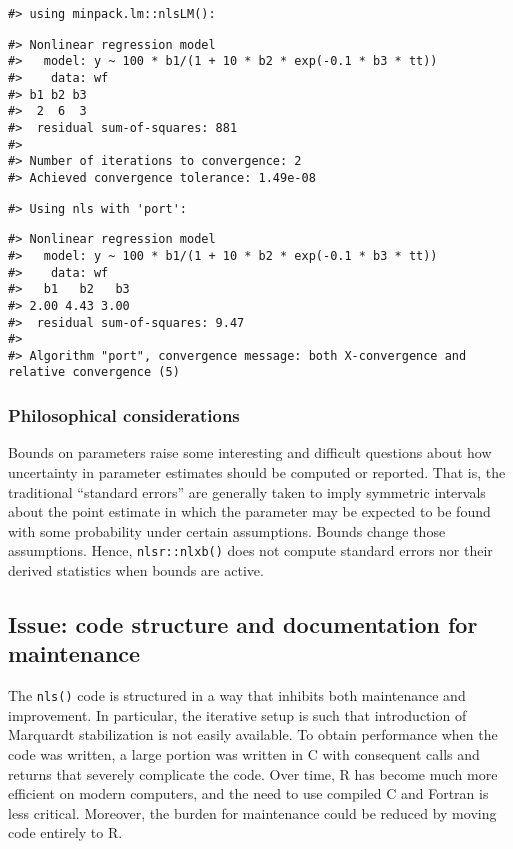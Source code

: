 \begin{verbatim}
#> using minpack.lm::nlsLM():
\end{verbatim}

\begin{verbatim}
#> Nonlinear regression model
#>   model: y ~ 100 * b1/(1 + 10 * b2 * exp(-0.1 * b3 * tt))
#>    data: wf
#> b1 b2 b3 
#>  2  6  3 
#>  residual sum-of-squares: 881
#> 
#> Number of iterations to convergence: 2 
#> Achieved convergence tolerance: 1.49e-08
\end{verbatim}

\begin{verbatim}
#> Using nls with 'port':
\end{verbatim}

\begin{verbatim}
#> Nonlinear regression model
#>   model: y ~ 100 * b1/(1 + 10 * b2 * exp(-0.1 * b3 * tt))
#>    data: wf
#>   b1   b2   b3 
#> 2.00 4.43 3.00 
#>  residual sum-of-squares: 9.47
#> 
#> Algorithm "port", convergence message: both X-convergence and relative convergence (5)
\end{verbatim}

\hypertarget{philosophical-considerations}{%
\subsubsection{Philosophical considerations}\label{philosophical-considerations}}

Bounds on parameters raise some interesting and difficult questions about how
uncertainty in parameter estimates should be computed or reported. That is, the
traditional ``standard errors'' are generally taken to imply symmetric intervals
about the point estimate in which the parameter may be expected to be found with
some probability under certain assumptions.
Bounds change those assumptions. Hence, \texttt{nlsr::nlxb()} does not compute standard
errors nor their derived statistics when bounds are active.

\hypertarget{issue-code-structure-and-documentation-for-maintenance}{%
\subsection{Issue: code structure and documentation for maintenance}\label{issue-code-structure-and-documentation-for-maintenance}}

The \texttt{nls()} code is structured in a way that inhibits both maintenance and
improvement. In particular, the iterative setup is such that introduction
of Marquardt stabilization is not easily available. To obtain performance
when the code was written, a large portion was written in C with consequent
calls and returns that severely complicate the code. Over time, R has become
much more efficient on modern computers, and the need to use compiled C and
Fortran is less critical. Moreover, the burden for maintenance
could be reduced by moving code entirely to R.

